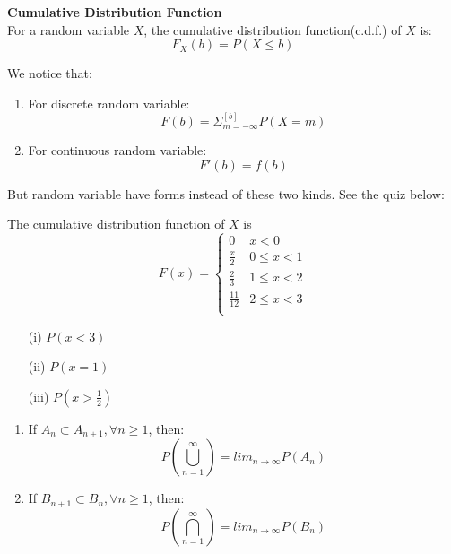 \documentclass{article}
\begin{document}
\begin{definition}
    \textbf{Cumulative Distribution Function}\\
    For a random variable $X$, the cumulative distribution function(c.d.f.) of $X$ is:
    $$ F_X(b) = P(X \leq b)$$
\end{definition}
We notice that:
\begin{enumerate}
    \item For discrete random variable:
    $$ F(b) = \Sigma^{[b]}_{m = -\infty}P(X = m) $$
    \item For continuous random variable:
    $$ F'(b) = f(b)$$
\end{enumerate}
But random variable have forms instead of these two kinds. See the quiz below:
\begin{quiz}
    The cumulative distribution function of $X$ is
    \[
    F(x) = 
    \begin{cases}
        0 & x < 0 \\
        \frac{x}{2} & 0 \leq x < 1 \\
        \frac{2}{3} & 1 \leq x < 2 \\
        \frac{11}{12} & 2 \leq x < 3\\
    \end{cases}
    \]
    \begin{enumerate}
        \item[(i)] $P(x < 3)$
        \item[(ii)] $P(x = 1)$
        \item[(iii)] $P(x > \frac{1}{2})$
    \end{enumerate}
\end{quiz}

\begin{theorem}
    \begin{enumerate}
        \item If $A_n \subset A_{n+1}, \forall n \geq 1$, then:
    $$P(\bigcup^{\infty}_{n=1}) = lim_{n \rightarrow \infty}P(A_n)$$
        \item If $B_{n+1} \subset B_{n}, \forall n \geq 1$, then:
    $$P(\bigcap^{\infty}_{n=1}) = lim_{n \rightarrow \infty}P(B_n)$$
    \end{enumerate}
\end{theorem}
\end{document}
